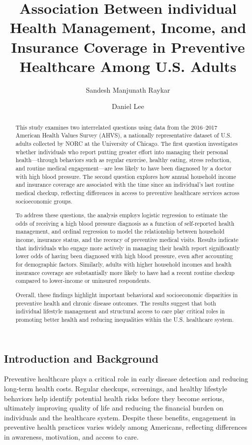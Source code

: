 \documentclass[
  letterpaper,
  DIV=11,
  numbers=noendperiod]{scrartcl}
\title{Association Between individual Health Management, Income, and
Insurance Coverage in Preventive Healthcare Among U.S. Adults}
\author{Sandesh Manjunath Raykar \and Daniel Lee}
\date{}
\begin{document}
\maketitle
\begin{abstract}
This study examines two interrelated questions using data from the
2016--2017 American Health Values Survey (AHVS), a nationally
representative dataset of U.S. adults collected by NORC at the
University of Chicago. The first question investigates whether
individuals who report putting greater effort into managing their
personal health---through behaviors such as regular exercise, healthy
eating, stress reduction, and routine medical engagement---are less
likely to have been diagnosed by a doctor with high blood pressure. The
second question explores how annual household income and insurance
coverage are associated with the time since an individual's last routine
medical checkup, reflecting differences in access to preventive
healthcare services across socioeconomic groups.

To address these questions, the analysis employs logistic regression to
estimate the odds of receiving a high blood pressure diagnosis as a
function of self-reported health management, and ordinal regression to
model the relationship between household income, insurance status, and
the recency of preventive medical visits. Results indicate that
individuals who engage more actively in managing their health report
significantly lower odds of having been diagnosed with high blood
pressure, even after accounting for demographic factors. Similarly,
adults with higher household incomes and health insurance coverage are
substantially more likely to have had a recent routine checkup compared
to lower-income or uninsured respondents.

Overall, these findings highlight important behavioral and socioeconomic
disparities in preventive health and chronic disease outcomes. The
results suggest that both individual lifestyle management and structural
access to care play critical roles in promoting better health and
reducing inequalities within the U.S. healthcare system.
\end{abstract}


\subsection{Introduction and Background}\label{sec-intro}

Preventive healthcare plays a critical role in early disease detection
and reducing long-term health costs. Regular checkups, screenings, and
healthy lifestyle behaviors help identify potential health risks before
they become serious, ultimately improving quality of life and reducing
the financial burden on individuals and the healthcare system. Despite
these benefits, engagement in preventive health practices varies widely
among Americans, reflecting differences in awareness, motivation, and
access to care.
\end{document}
